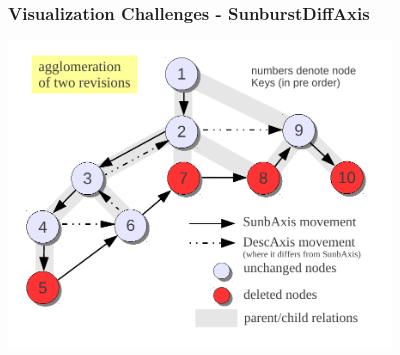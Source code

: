 \documentclass{beamer}
\begin{document}




\begin{frame}
\frametitle{Visualization Challenges - SunburstDiffAxis}
\begin{center}
\includegraphics[width=4.0in]{images/tree-axis.pdf}
\end{center}
\end{frame}
\end{document}

